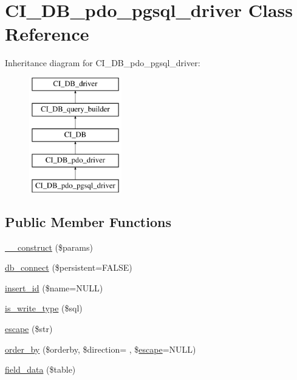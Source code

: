 \hypertarget{class_c_i___d_b__pdo__pgsql__driver}{}\section{C\+I\+\_\+\+D\+B\+\_\+pdo\+\_\+pgsql\+\_\+driver Class Reference}
\label{class_c_i___d_b__pdo__pgsql__driver}
Inheritance diagram for C\+I\+\_\+\+D\+B\+\_\+pdo\+\_\+pgsql\+\_\+driver\+:\begin{figure}[H]
\begin{center}
\leavevmode
\includegraphics[height=5.000000cm]{class_c_i___d_b__pdo__pgsql__driver}
\end{center}
\end{figure}
\subsection*{Public Member Functions}
\begin{DoxyCompactItemize}
\item 
\hyperlink{class_c_i___d_b__pdo__pgsql__driver_a9162320adff1a1a4afd7f2372f753a3e}{\+\_\+\+\_\+construct} (\$params)
\item 
\hyperlink{class_c_i___d_b__pdo__pgsql__driver_a52bf595e79e96cc0a7c907a9b45aeb4d}{db\+\_\+connect} (\$persistent=F\+A\+L\+S\+E)
\item 
\hyperlink{class_c_i___d_b__pdo__pgsql__driver_ae61dc2c85e5516f143f6246c686bc3fc}{insert\+\_\+id} (\$name=N\+U\+L\+L)
\item 
\hyperlink{class_c_i___d_b__pdo__pgsql__driver_af435df5703c238769d6d16fde6d51182}{is\+\_\+write\+\_\+type} (\$sql)
\item 
\hyperlink{class_c_i___d_b__pdo__pgsql__driver_ac8f37ca5703d4558c732e692194f8cd6}{escape} (\$str)
\item 
\hyperlink{class_c_i___d_b__pdo__pgsql__driver_af4bc938040ad30a93e4880f61568c72e}{order\+\_\+by} (\$orderby, \$direction= \textquotesingle{}\textquotesingle{}, \$\hyperlink{class_c_i___d_b__pdo__pgsql__driver_ac8f37ca5703d4558c732e692194f8cd6}{escape}=N\+U\+L\+L)
\item 
\hyperlink{class_c_i___d_b__pdo__pgsql__driver_a90355121e1ed009e0efdbd544ab56efa}{field\+\_\+data} (\$table)
\end{DoxyCompactItemize}
